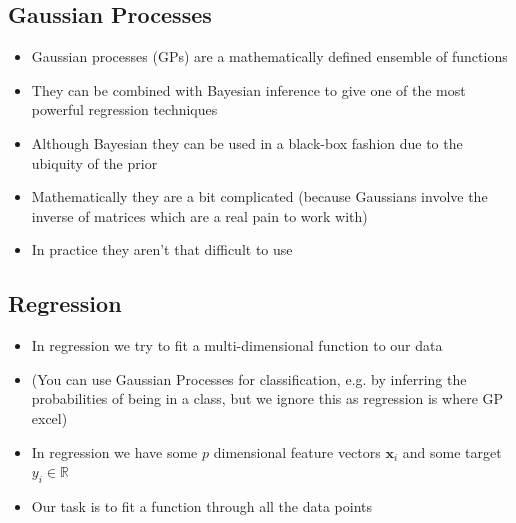\begin{slide}
\section{Gaussian Processes}

\begin{PauseHighLight}
  \begin{itemize}
  \item Gaussian processes (GPs) are a mathematically defined ensemble
    of functions\pause
  \item They can be combined with Bayesian inference to give one of the
    most powerful regression techniques\pause
  \item Although Bayesian they can be used in a black-box fashion
    due to the ubiquity of the prior\pause
  \item Mathematically they are a bit complicated\pause{} (because
    Gaussians involve the inverse of matrices which are a real pain to
    work with)\pauseb
  \item In practice they aren't that difficult to use\pause
  \end{itemize}
\end{PauseHighLight}

\end{slide}


\begin{slide}
\section{Regression}

\begin{PauseHighLight}
  \begin{itemize}
  \item In regression we try to fit a multi-dimensional function to our
    data\pause
  \item (You can use Gaussian Processes for classification, e.g. by
    inferring the probabilities of being in a class, but we ignore this
    as regression is where GP excel)\pause
  \item In regression we have some $p$ dimensional feature vectors
    $\bm{x}_i$ and some target $y_i \in \mathbb{R}$\pause
  \item Our task is to fit a function through all the data points\pause
  \end{itemize}
\end{PauseHighLight}

\end{slide}

